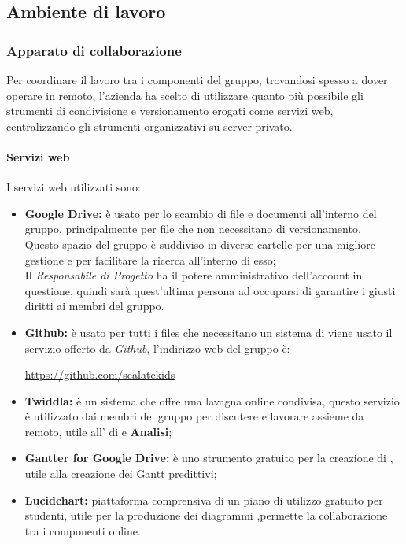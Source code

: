 \documentclass{scalatekids-article}
\begin{document}
\subsection{Ambiente di lavoro}
\subsubsection{Apparato di collaborazione}
Per coordinare il lavoro tra i componenti del gruppo, trovandosi spesso a dover
operare in remoto, l'azienda ha scelto di utilizzare quanto più possibile gli
strumenti di condivisione e versionamento erogati come servizi web,
centralizzando gli strumenti organizzativi su server privato.
\paragraph{Servizi web}
I servizi web utilizzati sono:
\begin{itemize}
\item\textbf{Google Drive:} è usato per lo scambio di file e documenti all'interno del gruppo, principalmente per file che non necessitano di versionamento.\\
  Questo spazio del gruppo è suddiviso in diverse cartelle per una migliore gestione e per facilitare la ricerca all'interno di esso;\\
  Il \textit{Responsabile di Progetto} ha il potere amministrativo dell'account in questione, quindi sarà quest'ultima persona ad occuparsi di garantire i giusti diritti ai membri del gruppo.
\item\textbf{Github:} è usato per tutti i files che necessitano un sistema di  viene usato il servizio offerto da \textit{Github}, l'indirizzo web del gruppo è:\\
  \begin{center}
    \url{https://github.com/scalatekids}
  \end{center}
\item\textbf{Twiddla:} è un sistema che offre una lavagna online condivisa, questo servizio è utilizzato dai membri del gruppo per discutere e lavorare assieme da remoto, utile all' di  e \textbf{Analisi};
\item\textbf{Gantter for Google Drive:} è uno strumento gratuito per la creazione di , utile alla creazione dei Gantt predittivi;
\item\textbf{Lucidchart:} piattaforma comprensiva di un piano di utilizzo
  gratuito per studenti, utile per la produzione dei diagrammi
  ,permette la collaborazione tra i componenti online.
\end{itemize}
\end{document}

